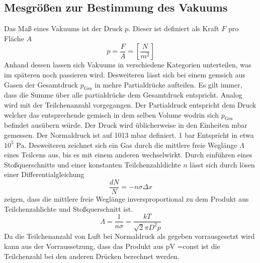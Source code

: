 \subsection{Mesgrößen zur Bestimmung des Vakuums}
Das Maß eines Vakuums ist der Druck $p$. Dieser ist definiert als Kraft $F$ pro Fläche $A$
\begin{equation}
  p = \frac{F}{A} = \left[ \frac{N}{m^2} \right]
  \label{eqn:druck}
\end{equation}
Anhand dessen lassen sich Vakuums in verschiedene Kategorien unterteilen, was im späteren noch passieren wird. Desweiteren lässt sich bei einem gemsich aus Gasen der Gesamtdruck $p_\text{Ges}$ in mehre Partialdrücke aufteilen. Es gilt immer, dass die Summe über alle partialdrücke dem Gesamtdruck entspricht. Analog wird mit der Teilchenanzahl vorgegangen. Der Partialdruck entspricht dem Druck welcher das entsprechende gemisch in dem selben Volume wodrin sich $p_\text{Ges}$ befindet ausübern würde. \newline
Der Druck wird üblicherweise in den Einheiten mbar gemessen. Der Normaldruck ist auf 1013 mbar definiert. 1 bar Entspricht in etwa $10^{5}$ Pa. \newline
Desweiteren zeichnet sich ein Gas durch die mittlere freie Weglänge $\Lambda$ eines Teilcens aus, bis es mit einem anderen wechselwirkt. Durch einführen eines Stoßquerschnitts und einer konstanten Teilchenzahldichte $n$ lässt sich durch lösen einer Differentialgleichung 
\begin{equation}
  \frac{dN}{N} = -n \sigma \Delta x
  \label{eqn:mfWDGL}
\end{equation}
zeigen, dass die mittlere freie Weglänge  inversproportional zu dem Produkt aus Teilchenzahlichte und Stoßquerschnitt ist.
\begin{equation}
  \Lambda = \frac{1}{n \sigma}= \frac{k T}{\sqrt{2} \pi D^2 p}
  \label{eqn:mfW}
\end{equation}
Da die Teilchenanzahl von Luft bei Normaldruck als gegeben vorrausgesetzt wird kann aus der Vorraussetzung, dass das Produkt aus pV =const ist die Teilchenzahl bei den anderen Drücken berechnet werden. 
